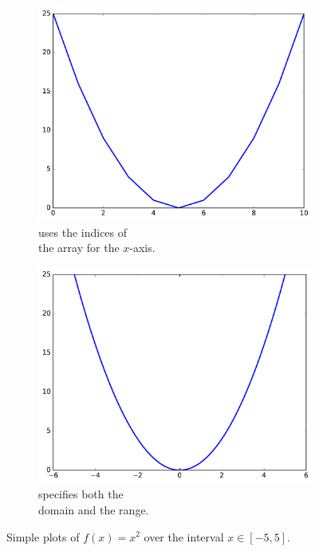 \begin{figure}[H] %
\captionsetup[subfigure]{justification=centering}
\centering
\begin{subfigure}{.5\textwidth}
    \centering
    \includegraphics[width=\linewidth]{figures/basic1.pdf}
    \caption{ uses the indices of\\the array for the $x$-axis.}
    \label{fig:basic1}
\end{subfigure}%
\begin{subfigure}{.5\textwidth}
    \centering
    \includegraphics[width=\linewidth]{figures/basic2.pdf}
    \caption{ specifies both the\\domain and the range.}
    \label{fig:basic2}
\end{subfigure}
\caption{Simple plots of $f(x) = x^2$ over the interval $x\in[-5,5]$.}
\end{figure}

